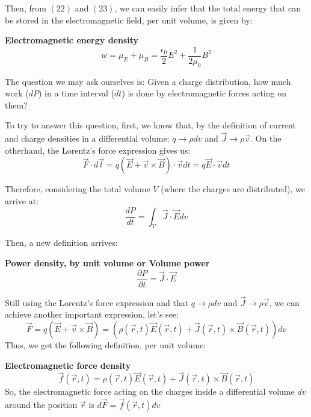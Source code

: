 \documentclass[11pt]{article}
\theoremstyle{definition}
\begin{document}
Then, from $(22)$ and $(23)$, we can easily infer that the total energy that can be stored in the electromagnetic field, per unit volume, is given by:
\begin{shaded}
    \textbf{Electromagnetic energy density}
    \begin{equation}
        w = \mu_{E} + \mu_{B} = \frac{\epsilon_{0}}{2}E^2 + \frac{1}{2\mu_{0}}B^2
    \end{equation}
\end{shaded}

The question we may ask ourselves is: Given a charge distribution, how much work ($dP$) in a time interval ($dt$) is done by electromagnetic forces acting on them?

To try to answer this question, first, we know that, by the definition of current and charge densities in a differential volume: $q \rightarrow \rho dv$ and $\vec{J} \rightarrow \rho \vec{v}$. On the otherhand,
 the Lorentz's force expression gives us:
\begin{equation}
    \vec{F} \cdot d\vec{l} = q\left(\vec{E}+\vec{v}\times \vec{B}\right) \cdot \vec{v}dt = q\vec{E} \cdot \vec{v}dt
\end{equation}

Therefore, considering the total volume $V$ (where the charges are distributed), we arrive at:
\begin{equation}
    \frac{dP}{dt} = \int_{V}\vec{J} \cdot \vec{E}dv
\end{equation}

Then, a new definition arrives:
\begin{shaded}
    \textbf{Power density, by unit volume or Volume power}
    \begin{equation}
        \frac{\partial P}{\partial t} = \vec{J} \cdot \vec{E}
    \end{equation}
\end{shaded}

Still using the Lorentz's force expression and that $q \rightarrow \rho dv$ and $\vec{J} \rightarrow \rho \vec{v}$, we can achieve another important expression, let's see:
\begin{equation}
    \vec{F} = q\left(\vec{E}+\vec{v} \times \vec{B}\right) = \left(\rho\left(\vec{r},t\right)\vec{E}\left(\vec{r},t\right) + \vec{J}\left(\vec{r},t\right) \times \vec{B}\left(\vec{r},t\right)\right)dv
\end{equation}
Thus, we get the following definition, per unit volume:
\begin{shaded}
    \textbf{Electromagnetic force density}
    \begin{equation}
        \vec{f}\left(\vec{r},t\right) = \rho\left(\vec{r},t\right)\vec{E}\left(\vec{r},t\right) + \vec{J}\left(\vec{r},t\right) \times \vec{B}\left(\vec{r},t\right)
    \end{equation}
So, the electromagnetic force acting on the charges inside a differential volume $dv$ around the position $\vec{r}$ is $d\vec{F} = \vec{f}\left(\vec{r},t\right)dv$
\end{shaded}
\end{document}
